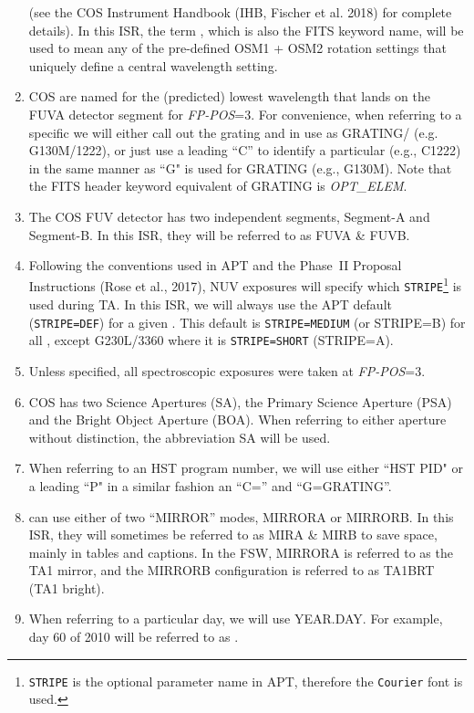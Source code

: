 \begin{enumerate}
{	(see the COS Instrument Handbook (IHB, Fischer et al. 2018) for complete details).
	In this ISR, the term \cenwave{}, which is also the FITS keyword name, will be used to mean any of the pre-defined OSM1 + OSM2 rotation settings that uniquely define a central wavelength setting.}
	\item{COS \cenwaves{} are named for the (predicted) lowest wavelength that lands on the FUVA detector segment for \textit{FP-POS}=3. For convenience, when referring to
	a specific \cenwave{} we will either call out the grating and \cenwave{} in use as GRATING/\cenwave{}  (e.g. G130M/1222), or just use a leading ``C'' to identify a particular \cenwave{} (e.g., C1222) in the same manner as ``G" is used for GRATING (e.g., G130M).
	Note that the FITS header keyword equivalent of GRATING is \textit{OPT\_ELEM}.}
	\item{The COS FUV detector has two independent segments, Segment-A and Segment-B. In this ISR, they will be referred to as FUVA \& FUVB.}
	\item{Following the conventions used in APT and the Phase~II Proposal Instructions (Rose et al., 2017), NUV  exposures will specify which \texttt{STRIPE}\footnote{\texttt{STRIPE} is the optional parameter name in APT, therefore the \texttt{Courier} font is used.} is used during TA. In this ISR, we will always use
	the APT default (\texttt{STRIPE=DEF}) for a given \cenwave{}. This default is \texttt{STRIPE=MEDIUM} (or STRIPE=B) for all \cenwaves{}, except G230L/3360 where it is \texttt{STRIPE=SHORT} (STRIPE=A).}
	\item{Unless specified, all spectroscopic exposures were taken at \textit{FP-POS}=3.}
	\item{COS has two Science Apertures (SA), the Primary Science Aperture (PSA) and the Bright Object Aperture (BOA). When referring to either aperture without distinction, the abbreviation SA will be used.}
	\item{When referring to an HST program number, we will use either ``HST PID" or a leading ``P" in a similar fashion an ``C=\cenwave{}'' and ``G=GRATING''.}
	\item{ can use either of two ``MIRROR'' modes, MIRRORA or MIRRORB. In this ISR, they will sometimes be referred to as MIRA \& MIRB to save space, mainly in tables and captions.
	In the FSW, MIRRORA is referred to as the TA1 mirror, and the MIRRORB configuration is referred to as TA1BRT (TA1 bright).}
	\item{When referring to a particular day, we will use YEAR.DAY. For example, day 60 of 2010 will be referred to as \psiafdate.
}
\end{enumerate}
